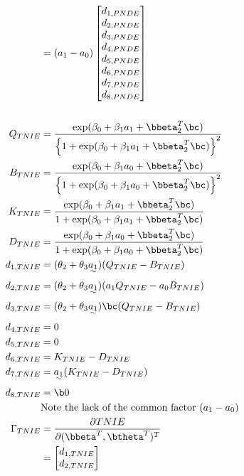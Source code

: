 \documentclass[10pt]{article}
\begin{document}
\begin{align*}
  &= (a_{1}-a_{0})
    \begin{bmatrix}
      d_{1,PNDE}\\
      d_{2,PNDE}\\
      d_{3,PNDE}\\
      d_{4,PNDE}\\
      d_{5,PNDE}\\
      d_{6,PNDE}\\
      d_{7,PNDE}\\
      d_{8,PNDE}\\
    \end{bmatrix}\\
  \\
  Q_{TNIE} &= \frac
      {            \exp(\beta_{0} + \beta_{1}a_{1} + \bbeta_{2}^{T}\bc)}
      {\left\{ 1 + \exp(\beta_{0} + \beta_{1}a_{1} + \bbeta_{2}^{T}\bc) \right\}^{2}}\\
  B_{TNIE} &= \frac
      {            \exp(\beta_{0} + \beta_{1}a_{0} + \bbeta_{2}^{T}\bc)}
      {\left\{ 1 + \exp(\beta_{0} + \beta_{1}a_{0} + \bbeta_{2}^{T}\bc) \right\}^{2}}\\
  K_{TNIE} &= \frac
      {    \exp(\beta_{0} + \beta_{1}a_{1} + \bbeta_{2}^{T}\bc)}
      {1 + \exp(\beta_{0} + \beta_{1}a_{1} + \bbeta_{2}^{T}\bc)}\\
  D_{TNIE} &= \frac
      {    \exp(\beta_{0} + \beta_{1}a_{0} + \bbeta_{2}^{T}\bc)}
      {1 + \exp(\beta_{0} + \beta_{1}a_{0} + \bbeta_{2}^{T}\bc)}\\
  d_{1,TNIE} &= (\theta_{2} + \theta_{3}\uwave{a_{1}}) (Q_{TNIE} - B_{TNIE})\\
  d_{2,TNIE} &= (\theta_{2} + \theta_{3}\uwave{a_{1}}) (a_{1}Q_{TNIE} - a_{0}B_{TNIE})\\
  d_{3,TNIE} &= (\theta_{2} + \theta_{3}\uwave{a_{1}})\bc (Q_{TNIE} - B_{TNIE})\\
  d_{4,TNIE} &= 0\\
  d_{5,TNIE} &= 0\\
  d_{6,TNIE} &= K_{TNIE} - D_{TNIE}\\
  d_{7,TNIE} &= \uwave{a_{1}} (K_{TNIE} - D_{TNIE})\\
  d_{8,TNIE} &= \b0\\
  &\text{Note the lack of the common factor }(a_{1} - a_{0})\\
  \Gamma_{TNIE}
  &= \frac{\partial TNIE}{\partial (\bbeta^{T},\btheta^{T})^{T}}\\
  &= \begin{bmatrix}
      d_{1,TNIE}\\
      d_{2,TNIE}\\

\end{bmatrix}
\end{align*}
\end{document}

